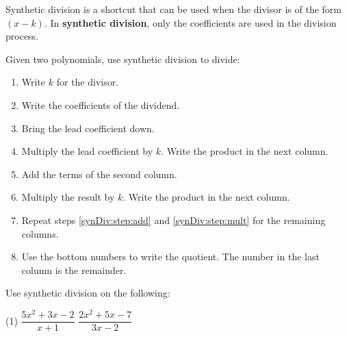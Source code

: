 \documentclass[../mathNotesPreamble]{subfiles}
\begin{document}
    \begin{defn*}
      Synthetic division is a shortcut that can be used when the divisor is of the form $(x-k)$. In \textbf{synthetic division}, only the coefficients are used in the division process.
      \vspace*{0.5\baselineskip}

      Given two polynomials, use synthetic division to divide:
      \begin{enumerate}
        \item Write $k$ for the divisor.
        \item Write the coefficients of the dividend.
        \item Bring the lead coefficient down.
        \item Multiply the lead coefficient by $k$. Write the product in the next column.
        \item Add the terms of the second column. \label{synDiv:step:add}
        \item Multiply the result by $k$. Write the product in the next column. \label{synDiv:step:mult}
        \item Repeat steps \ref{synDiv:step:add} and \ref{synDiv:step:mult} for the remaining columns.
        \item Use the bottom numbers to write the quotient. The number in the last column is the remainder. 
      \end{enumerate}
    \end{defn*}

    \begin{ex*}
      Use synthetic division on the following:
      \begin{extasks}[after-item-skip=\stretch{1}](1)
        \task $\dfrac{5x^2+3x-2}{x+1}$
        \task $\dfrac{2x^2+5x-7}{3x-2}$
      \end{extasks}
    \end{ex*}
    \pagebreak
\end{document}
